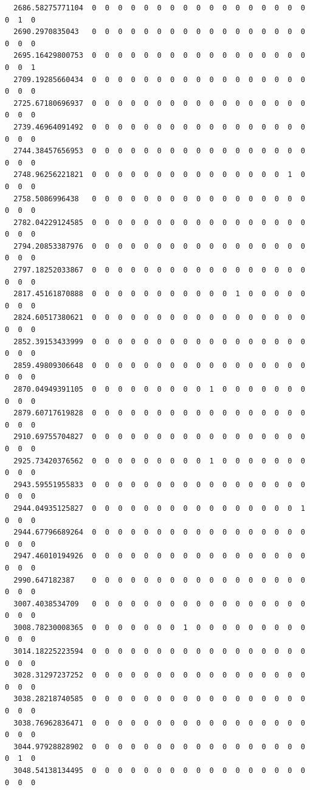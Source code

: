 \documentclass[
  letterpaper,
  DIV=11,
  numbers=noendperiod]{scrartcl}
\begin{document}
\begin{verbatim}
  2686.58275771104  0  0  0  0  0  0  0  0  0  0  0  0  0  0  0  0  0  0  1  0
  2690.2970835043   0  0  0  0  0  0  0  0  0  0  0  0  0  0  0  0  0  0  0  0
  2695.16429800753  0  0  0  0  0  0  0  0  0  0  0  0  0  0  0  0  0  0  0  1
  2709.19285660434  0  0  0  0  0  0  0  0  0  0  0  0  0  0  0  0  0  0  0  0
  2725.67180696937  0  0  0  0  0  0  0  0  0  0  0  0  0  0  0  0  0  0  0  0
  2739.46964091492  0  0  0  0  0  0  0  0  0  0  0  0  0  0  0  0  0  0  0  0
  2744.38457656953  0  0  0  0  0  0  0  0  0  0  0  0  0  0  0  0  0  0  0  0
  2748.96256221821  0  0  0  0  0  0  0  0  0  0  0  0  0  0  0  1  0  0  0  0
  2758.5086996438   0  0  0  0  0  0  0  0  0  0  0  0  0  0  0  0  0  0  0  0
  2782.04229124585  0  0  0  0  0  0  0  0  0  0  0  0  0  0  0  0  0  0  0  0
  2794.20853387976  0  0  0  0  0  0  0  0  0  0  0  0  0  0  0  0  0  0  0  0
  2797.18252033867  0  0  0  0  0  0  0  0  0  0  0  0  0  0  0  0  0  0  0  0
  2817.45161870888  0  0  0  0  0  0  0  0  0  0  0  1  0  0  0  0  0  0  0  0
  2824.60517380621  0  0  0  0  0  0  0  0  0  0  0  0  0  0  0  0  0  0  0  0
  2852.39153433999  0  0  0  0  0  0  0  0  0  0  0  0  0  0  0  0  0  0  0  0
  2859.49809306648  0  0  0  0  0  0  0  0  0  0  0  0  0  0  0  0  0  0  0  0
  2870.04949391105  0  0  0  0  0  0  0  0  0  1  0  0  0  0  0  0  0  0  0  0
  2879.60717619828  0  0  0  0  0  0  0  0  0  0  0  0  0  0  0  0  0  0  0  0
  2910.69755704827  0  0  0  0  0  0  0  0  0  0  0  0  0  0  0  0  0  0  0  0
  2925.73420376562  0  0  0  0  0  0  0  0  0  1  0  0  0  0  0  0  0  0  0  0
  2943.59551955833  0  0  0  0  0  0  0  0  0  0  0  0  0  0  0  0  0  0  0  0
  2944.04935125827  0  0  0  0  0  0  0  0  0  0  0  0  0  0  0  0  1  0  0  0
  2944.67796689264  0  0  0  0  0  0  0  0  0  0  0  0  0  0  0  0  0  0  0  0
  2947.46010194926  0  0  0  0  0  0  0  0  0  0  0  0  0  0  0  0  0  0  0  0
  2990.647182387    0  0  0  0  0  0  0  0  0  0  0  0  0  0  0  0  0  0  0  0
  3007.4038534709   0  0  0  0  0  0  0  0  0  0  0  0  0  0  0  0  0  0  0  0
  3008.78230008365  0  0  0  0  0  0  0  1  0  0  0  0  0  0  0  0  0  0  0  0
  3014.18225223594  0  0  0  0  0  0  0  0  0  0  0  0  0  0  0  0  0  0  0  0
  3028.31297237252  0  0  0  0  0  0  0  0  0  0  0  0  0  0  0  0  0  0  0  0
  3038.28218740585  0  0  0  0  0  0  0  0  0  0  0  0  0  0  0  0  0  0  0  0
  3038.76962836471  0  0  0  0  0  0  0  0  0  0  0  0  0  0  0  0  0  0  0  0
  3044.97928828902  0  0  0  0  0  0  0  0  0  0  0  0  0  0  0  0  0  0  1  0
  3048.54138134495  0  0  0  0  0  0  0  0  0  0  0  0  0  0  0  0  0  0  0  0

\end{verbatim}
\end{document}
